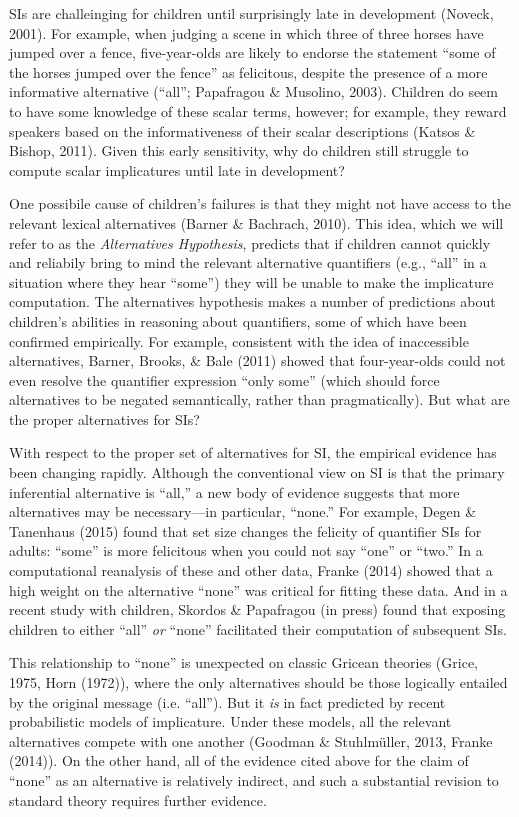 \documentclass[10pt, letterpaper]{article}
\begin{document}
SIs are challeinging for children until surprisingly late in development
(Noveck, 2001). For example, when judging a scene in which three of
three horses have jumped over a fence, five-year-olds are likely to
endorse the statement ``some of the horses jumped over the fence'' as
felicitous, despite the presence of a more informative alternative
(``all''; Papafragou \& Musolino, 2003). Children do seem to have some
knowledge of these scalar terms, however; for example, they reward
speakers based on the informativeness of their scalar descriptions
(Katsos \& Bishop, 2011). Given this early sensitivity, why do children
still struggle to compute scalar implicatures until late in development?

One possibile cause of children's failures is that they might not have
access to the relevant lexical alternatives (Barner \& Bachrach, 2010).
This idea, which we will refer to as the \emph{Alternatives Hypothesis},
predicts that if children cannot quickly and reliabily bring to mind the
relevant alternative quantifiers (e.g., ``all'' in a situation where
they hear ``some'') they will be unable to make the implicature
computation. The alternatives hypothesis makes a number of predictions
about children's abilities in reasoning about quantifiers, some of which
have been confirmed empirically. For example, consistent with the idea
of inaccessible alternatives, Barner, Brooks, \& Bale (2011) showed that
four-year-olds could not even resolve the quantifier expression ``only
some'' (which should force alternatives to be negated semantically,
rather than pragmatically). But what are the proper alternatives for
SIs?

With respect to the proper set of alternatives for SI, the empirical
evidence has been changing rapidly. Although the conventional view on SI
is that the primary inferential alternative is ``all,'' a new body of
evidence suggests that more alternatives may be necessary---in
particular, ``none.'' For example, Degen \& Tanenhaus (2015) found that
set size changes the felicity of quantifier SIs for adults: ``some'' is
more felicitous when you could not say ``one'' or ``two.'' In a
computational reanalysis of these and other data, Franke (2014) showed
that a high weight on the alternative ``none'' was critical for fitting
these data. And in a recent study with children, Skordos \& Papafragou
(in press) found that exposing children to either ``all'' \emph{or}
``none'' facilitated their computation of subsequent SIs.

This relationship to ``none'' is unexpected on classic Gricean theories
(Grice, 1975, Horn (1972)), where the only alternatives should be those
logically entailed by the original message (i.e. ``all''). But it
\emph{is} in fact predicted by recent probabilistic models of
implicature. Under these models, all the relevant alternatives compete
with one another (Goodman \& Stuhlm{ü}ller, 2013, Franke (2014)). On the
other hand, all of the evidence cited above for the claim of ``none'' as
an alternative is relatively indirect, and such a substantial revision
to standard theory requires further evidence.
\end{document}
